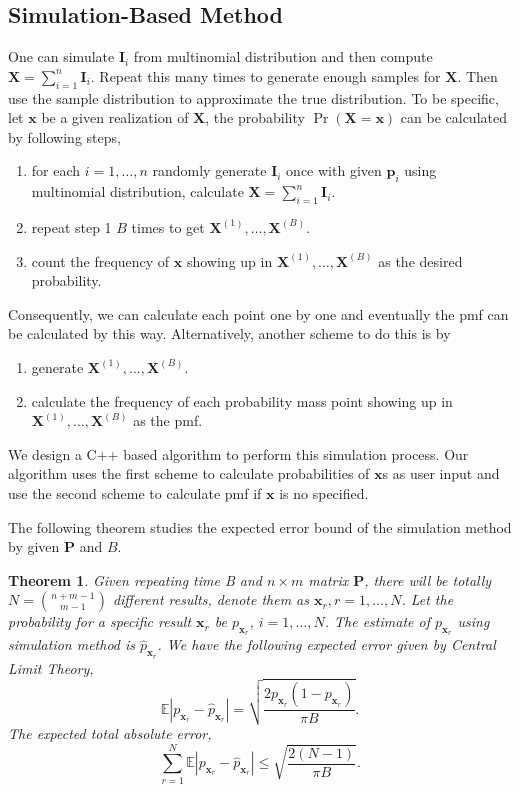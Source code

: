 \documentclass[12pt]{article}
\newcommand{\Ivec}{{\boldsymbol{I}}}
\newcommand{\EE}{\mathbb{E}}
\newcommand{\Pmat}{\mathbf{P}}
\newcommand{\pvec}{\boldsymbol{p}}
\newcommand{\wh}{\widehat}
\newcommand{\Xvec}{\boldsymbol{X}}
\newcommand{\xvec}{\boldsymbol{x}}
\newtheorem{thm}{Theorem}
\begin{document}
\subsection{Simulation-Based Method}
One can simulate $\Ivec_i$ from multinomial distribution and then compute $\Xvec = \sum_{i=1}^{n}\Ivec_i$. Repeat this many times to generate enough samples for $\Xvec$. Then use the sample distribution to approximate the true distribution. To be specific, let $\xvec$ be a given realization of $\Xvec$, the probability $\Pr(\Xvec=\xvec)$ can be calculated by following steps,
\begin{enumerate}[Step 1]
    \item for each $i=1,\dots,n$ randomly generate $\Ivec_i$ once with given $\pvec_i$ using multinomial distribution, calculate $\Xvec = \sum_{i=1}^{n}\Ivec_i$.
    \item repeat step 1 $B$ times to get $\Xvec^{(1)},\dots,\Xvec^{(B)}$.
    \item count the frequency of $\xvec$ showing up in $\Xvec^{(1)},\dots,\Xvec^{(B)}$ as the desired probability.
\end{enumerate}
Consequently, we can calculate each point one by one and eventually the pmf can be calculated by this way. Alternatively, another scheme to do this is by
\begin{enumerate}[Step 1]
	\item generate $\Xvec^{(1)},\dots,\Xvec^{(B)}$.
	\item calculate the frequency of each probability mass point showing up in $\Xvec^{(1)},\dots,\Xvec^{(B)}$ as the pmf.
\end{enumerate}

We design a C++ based algorithm to perform this simulation process. Our algorithm uses the first scheme to calculate probabilities of $\xvec$s as user input  and use the second scheme to calculate pmf if $\xvec$ is no specified.

The following theorem studies the expected error bound of the simulation method by given $\Pmat$ and $B$.
\begin{thm}
Given repeating time \mbox{B} and $n \times m$ matrix $\Pmat$, there will be totally  $N=\binom{n+m-1}{m-1}$ different results, denote them as  $\xvec_r, r=1,\dots,N$. Let the probability for a specific result $\xvec_{r}$ be $p_{\xvec_{r}}$, $i=1,\dots,N$. The estimate of  $p_{\xvec_{r}}$ using simulation method is $\wh{p}_{\xvec_r}$. We have the following expected error given by Central Limit Theory,
\begin{equation*}
    \EE|p_{\xvec_r} - \wh{p}_{\xvec_r}| =  \sqrt{\frac{2 p_{\xvec_r}(1-p_{\xvec_r})}{\pi B}}.
\end{equation*}
The expected total absolute error,
$$\sum_{r=1}^{N} \EE|p_{\xvec_r} - \wh{p}_{\xvec_r}| \leq \sqrt{\frac{2(N-1)}{\pi B}}.$$
\end{thm}
\end{document}
